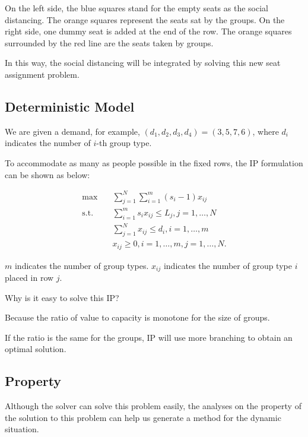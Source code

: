 On the left side, the blue squares stand for the empty seats as the social distancing. The orange squares represent the seats sat by the groups. 
On the right side, one dummy seat is added at the end of the row. The orange squares surrounded by the red line are the seats taken by groups.

In this way, the social distancing will be integrated by solving this new seat assignment problem.


\subsection{Deterministic Model}
We are given a demand, for example, $(d_1, d_2, d_3, d_4) = (3,5,7,6)$, where $d_i$ indicates the number of $i$-th group type.

To accommodate as many as people possible in the fixed rows, the IP formulation can be shown as below:

\begin{equation}\label{deter_upper}
    \begin{aligned}
      \max \quad & \sum_{j =1}^{N} \sum_{i = 1}^{m} (s_i -1) x_{ij} \\
      \text {s.t.} \quad & \sum_{i = 1}^{m} s_i x_{ij} \leq L_{j}, j=1,\ldots,N \\
      & \sum_{j =1}^{N} x_{ij} \leq d_{i}, i=1,\ldots,m \\
      & x_{ij} \geq 0, i=1,\ldots,m, j=1,\ldots,N.
    \end{aligned}
\end{equation}

$m$ indicates the number of group types. $x_{ij}$ indicates the number of group type $i$ placed in row $j$.

Why is it easy to solve this IP?

Because the ratio of value to capacity is monotone for the size of groups.

If the ratio is the same for the groups, IP will use more branching to obtain an optimal solution.


\subsection{Property}
Although the solver can solve this problem easily, the analyses on the property of the solution to this problem can help us generate a method for the dynamic situation. 

